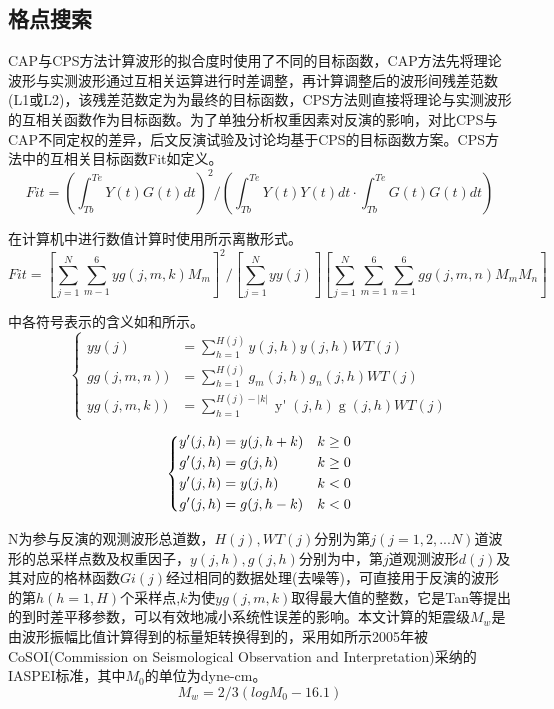 \subsection{格点搜索}

CAP与CPS方法计算波形的拟合度时使用了不同的目标函数，CAP方法先将理论波形与实测波形通过互相关运算进行时差调整，再计算调整后的波形间残差范数(L1或L2)\citep{Zhao1994}，该残差范数定为为最终的目标函数，CPS方法则直接将理论与实测波形的互相关函数作为目标函数。为了单独分析权重因素对反演的影响，对比CPS与CAP不同定权的差异，后文反演试验及讨论均基于CPS的目标函数方案。CPS方法中的互相关目标函数Fit如定义。
\begin{equation}
\label{eq2_12}
Fit=(\int_{Tb}^{Te}Y(t)G(t)dt)^2/(\int_{Tb}^{Te}Y(t)Y(t)dt\cdot\int_{Tb}^{Te}G(t)G(t)dt)
\end{equation}

在计算机中进行数值计算时使用所示离散形式。
\begin{equation}
\label{eq2_13}
Fit=[\sum_{j=1}^{N}\sum_{m-1}^{6}yg(j,m,k)M_m]^2/{[\sum_{j=1}^{N}yy(j)][\sum_{j=1}^{N}\sum_{m=1}^{6}\sum_{n=1}^{6}gg(j,m,n)M_mM_n]}
\end{equation}

中各符号表示的含义如和所示。
\begin{equation}
\label{eq2_14}
\left\{
    \begin{aligned}
    yy(j)&=\sum_{h=1}^{H(j)}y(j,h)y(j,h)WT(j)\\
    gg(j,m,n))&=\sum_{h=1}^{H(j)}g_{m}(j,h)g_{n}(j,h)WT(j)\\
    yg(j,m,k))&=\sum_{h=1}^{H(j)-|k|}\mathop{{y}'}(j,h)\mathop{{g}'_{m}}(j,h)WT(j)
    \end{aligned}
\right.
\end{equation}

\begin{equation}
\label{eq2_15}
\left\{
    \begin{aligned}
    \mathop{{y}'}(j,h)&=y(j,h+k) &k\geq0 \\
    \mathop{{g}'}(j,h)&=g(j,h)   &k\geq0 \\
    \mathop{{y}'}(j,h)&=y(j,h)   &k<0 \\
    \mathop{{g}'}(j,h)&=g(j,h-k) &k<0 \\
    \end{aligned}   \\
\right.
\end{equation}

N为参与反演的观测波形总道数，$H(j),WT(j)$分别为第$j(j=1,2,...N)$道波形的总采样点数及权重因子，$y(j,h),g(j,h)$分别为中，第$j$道观测波形$d(j)$及其对应的格林函数$Gi(j)$经过相同的数据处理(去噪等)，可直接用于反演的波形的第$h(h=1,H)$个采样点,$k$为使$yg(j,m,k)$取得最大值的整数，它是Tan等\citep{Tan2006}提出的到时差平移参数，可以有效地减小系统性误差的影响。本文计算的矩震级$M_w$是由波形振幅比值计算得到的标量矩转换得到的，采用如所示2005年被CoSOI(Commission on Seismological Observation and Interpretation)采纳的IASPEI标准，其中$M_0$的单位为dyne-cm。
\begin{equation}
\label{eq2_16}
	M_w=2/3(logM_0-16.1)
\end{equation}

